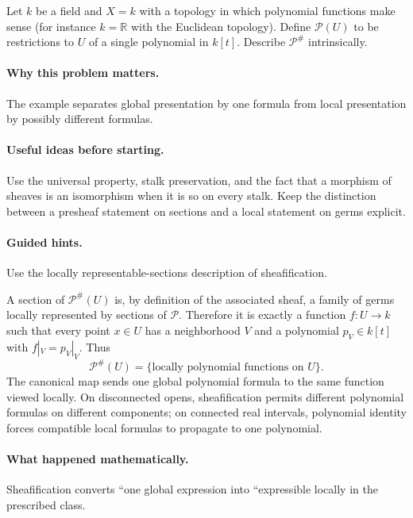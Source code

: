 \begin{problem}
Let $k$ be a field and $X=k$ with a topology in which polynomial functions make sense (for instance $k=\mathbb R$ with the Euclidean topology). Define $\mathcal P(U)$ to be restrictions to $U$ of a single polynomial in $k[t]$. Describe $\mathcal P^\#$ intrinsically.
\end{problem}

\paragraph{Why this problem matters.}
The example separates global presentation by one formula from local presentation by possibly different formulas.

\paragraph{Useful ideas before starting.}
Use the universal property, stalk preservation, and the fact that a morphism of sheaves is an isomorphism when it is so on every stalk.  Keep the distinction between a presheaf statement on sections and a local statement on germs explicit.

\paragraph{Guided hints.}
Use the locally representable-sections description of sheafification.

\ifdefined\FullProblemDossiers
\begin{solution}
A section of $\mathcal P^\#(U)$ is, by definition of the associated sheaf, a family of germs locally represented by sections of $\mathcal P$. Therefore it is exactly a function $f:U\to k$ such that every point $x\in U$ has a neighborhood $V$ and a polynomial $p_V\in k[t]$ with $f|_V=p_V|_V$. Thus
\[
\mathcal P^\#(U)=\{\text{locally polynomial functions on }U\}.
\]
The canonical map sends one global polynomial formula to the same function viewed locally. On disconnected opens, sheafification permits different polynomial formulas on different components; on connected real intervals, polynomial identity forces compatible local formulas to propagate to one polynomial.
\end{solution}

\paragraph{What happened mathematically.}
Sheafification converts ``one global expression into ``expressible locally in the prescribed class.

